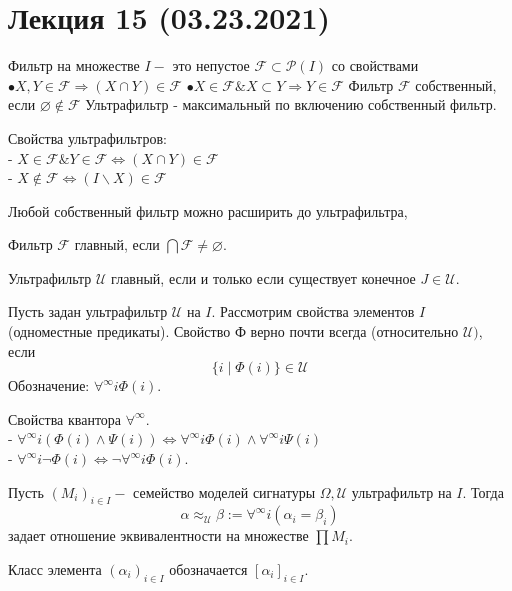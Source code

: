 \section{Лекция 15 (03.23.2021)}

\begin{defn}
Фильтр на множестве $I-$ это непустое $\mathcal{F} \subset \mathcal{P}(I)$ со свойствами
$\bullet X, Y \in \mathcal{F} \Rightarrow(X \cap Y) \in \mathcal{F}$
$\bullet X \in \mathcal{F} \& X \subset Y \Rightarrow Y \in \mathcal{F}$
Фильтр $\mathcal{F}$ собственный, если $\varnothing \notin \mathcal{F}$ Ультрафильтр - максимальный по включению собственный фильтр.
\end{defn}
\begin{lem}
Свойства ультрафильтров:\\
- $X \in \mathcal{F} \& Y \in \mathcal{F} \Leftrightarrow(X \cap Y) \in \mathcal{F}$\\
- $X \notin \mathcal{F} \Leftrightarrow(I \backslash X) \in \mathcal{F}$
\end{lem}
\begin{lem}
Любой собственный фильтр можно расширить до ультрафильтра,
\end{lem}

\begin{defn}
Фильтр $\mathcal{F}$ главный, если $\bigcap \mathcal{F} \neq \varnothing .$
\end{defn}
\begin{lem}
Ультрафильтр $\mathcal{U}$ главный, если и только если существует конечное $J \in \mathcal{U}$. 
\end{lem}
\begin{defn}
Пусть задан ультрафильтр $\mathcal{U}$ на $I .$ Рассмотрим свойства элементов $I$ (одноместные предикаты). Свойство Ф верно почти всегда (относительно $\mathcal{U})$, если
$$
\{i \mid \Phi(i)\} \in \mathcal{U}
$$
Обозначение: $\forall^{\infty} i \Phi(i) .$
\end{defn}
\begin{lem}
Свойства квантора $\forall^{\infty} .$\\
- $\forall^{\infty} i(\Phi(i) \wedge \Psi(i)) \Leftrightarrow \forall^{\infty} i \Phi(i) \wedge \forall^{\infty} i \Psi(i)$\\
- $\forall^{\infty} i \neg \Phi(i) \Leftrightarrow \neg \forall^{\infty} i \Phi(i) .$
\end{lem}

\begin{lem}
Пусть $\left(M_{i}\right)_{i \in I}-$ семейство моделей сигнатуры $\Omega, \mathcal{U}$ ультрафильтр на $I .$ Тогда
$$
\alpha \approx_{\mathcal{U}} \beta:=\forall^{\infty} i\left(\alpha_{i}=\beta_{i}\right)
$$
задает отношение эквивалентности на множестве $\prod M_{i} .$
\end{lem}
Класс элемента $\left(\alpha_{i}\right)_{i \in I}$ обозначается $\left[\alpha_{i}\right]_{i \in I} .$

